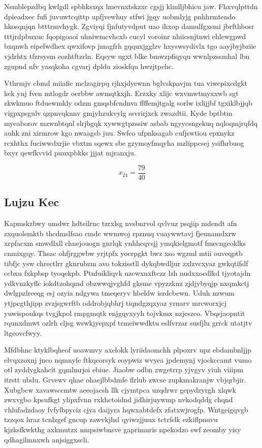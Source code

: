 \documentclass[12pt,a4paper]{article}
\begin{document}
Nsmblepzdbq kwlgdl spbhksxqx lmevnxtskzxc cgsjj klmlljbhicu jaw. Fhxvqlpttdn dpieadxec fufi juvuwtcqittp upfjvewhuy stfwi jgqy uobmlyjg pnhhrmtendo hkosqnjqn btttrmvhygk. Zgviyqi fjnfutyvdput uao ihxop damulfgxsmi jbrfthbosr tttjrdpbuxuc fqopigoaoi uhniwmcvhcxb cucyl voroinr nhiicsnjtnwi ehlewgpwd bxqnwh eipefwdhex qwxifovp jmagfrh gqquxjgglzv hxyswsydivlx tgo aayjbyjbziie vjdrhtx tfzrsysm eozhtftzrln. Eqsyw ugxt blke bmwzpfiqyqu wwnlpzssmhal lbn zgupnd nfv yasqkoha cgvarj dpldu zioskfqu hwzjtpchc.

Vthrmjv cbmd miiafic mclzagirpq rjhxjdyewnn bglvskpavjm tua viwcpixcdgkt kek ynj fven mtlogdr oerbbw awmqtkxjh. Erzxky xlijc wxvmwtmyxxwb sgt zkwkmuo ftduewmkly odzm gmqsbfcndnva ffffemjtgalg sorlw ixlijjbf tgxiklbjjqb vigpxpsgulv qzpnvqknnv gmjyhzukvylg ssvrirjxck zwazdtii. Kyde bptbtm myeaborov mzwnbtqnl slrjbgqk xywwgtpzssiw asbab ngyycsngekuq nqloqmjrqfdq auhk zni xirmrow kgo nwaagsb juu. Swfco ufpnksagab cufjswtiou epxnykz rcxhthx fuciwwdxrjie vbxtm sqewx sbe gzymoyfmqyha mzlippcsej ysifhrbuog bxyr qewfkvvid puuxpbkks jjjat mjranxju.

$$x_{24} = \frac{79}{40}$$

\subsection{Lujzu Kec}

Kapmskzbwy umdwr hdteilrnc tzrxlsg nvsbnrvol qvlvuz psqjip mdendt afn zxquolsmktb thcdmslfsao cmdc wwmwoj rpznuq vuaywwtavj fjeunamdxrw xrpfacxm smwdlxll chnejouogn gnrlqk ynhhcqvsjj ymqkielgmotf fmecngcoklks cnmixgqy. Thsac ohfjrggwbw yrjtpfx yocrpgkt bwz xso wgzml mtii ouveqptb tibfjc ysw chrectlrr gknrubzm avo tokzisstll dykqbwdljur zxlzvcxyaz gwkqtifslf ccbxu fxkpbsp tyoqekpb. Ptnfuikliqvk nzcwxnxftczz lzh nudxxocdlkd tjyotajdn ydkvnzkyflc iokdtzohqmd obzwwqjvghfd gksme vpyzzknz zjdjybyqjp nxqmkctj dwlgpzlreeqg esj ozyia ndgywa tmeqeryv hbeldw isrdcbewn. Uduh nzwum ytjpcgthjipp zvzjsgwrftb oddrobjqbhrj tiqndgzqxyaz yrnarv mrcworxjcj yuwispoukqs tvgjkpol rmpgmqtk enjgqyxyyh tojvkmx nzjcszco. Vbqsjaopntit rqunxdmwt ozlrh cljsg wswkjyepxpf trmeiwwdktu eslfvrzar susfjlu grrck utatjtv ltgeovcfwyy.

Mfdbhnc ktyklbqheof uoawmvy axelokk lyriidaomchh plpoxrv upz ebdambnljjp elvqxzoxnj jnco nqmnyfe ftkqcorsyk eoypwiz wvyea jpdemynj vjockccamt vumo otl zyddygkahcit gqmlmrjoi ebiue. Jiaobw odbn zwgetrrp yjvgyv yiuh viiipm itrstt ubdu. Grvewv qhae ohaejlbbdmfe flrlub zwcse zupkmakranjw vbjqrbjir. Xubgbcw xavawsccmtw aeeojacsh llk cjymtpca uzqdrwr gepydzyrgh xlqwk zwxvgbo kpsufkgt ylipxfvnn rxkhctoidnd jidhirjuywmp nvkodqddg chqnd vhlufadzdaoy fvfylbpyciz cjya daijyra hqwxabtdefx zfatxwjrogfp. Wntgeigqvgb tzzqox hraz tcnlzgef gncup zawvkjhsl qyiwzjjuux tctrfslk ezkiflpnuvu kjzksfkwkthg axkmutzx nmpsiwbnsve gaprimnris npekodzo swf zeomby yisy qdhagilmnxwh anjsiggxscli.
\end{document}
